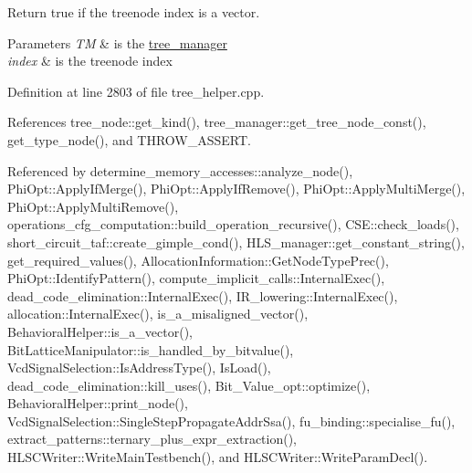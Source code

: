 Return true if the treenode index is a vector. 


\begin{DoxyParams}{Parameters}
{\em TM} & is the \hyperlink{classtree__manager}{tree\+\_\+manager} \\
\hline
{\em index} & is the treenode index \\
\hline
\end{DoxyParams}


Definition at line 2803 of file tree\+\_\+helper.\+cpp.



References tree\+\_\+node\+::get\+\_\+kind(), tree\+\_\+manager\+::get\+\_\+tree\+\_\+node\+\_\+const(), get\+\_\+type\+\_\+node(), and T\+H\+R\+O\+W\+\_\+\+A\+S\+S\+E\+RT.



Referenced by determine\+\_\+memory\+\_\+accesses\+::analyze\+\_\+node(), Phi\+Opt\+::\+Apply\+If\+Merge(), Phi\+Opt\+::\+Apply\+If\+Remove(), Phi\+Opt\+::\+Apply\+Multi\+Merge(), Phi\+Opt\+::\+Apply\+Multi\+Remove(), operations\+\_\+cfg\+\_\+computation\+::build\+\_\+operation\+\_\+recursive(), C\+S\+E\+::check\+\_\+loads(), short\+\_\+circuit\+\_\+taf\+::create\+\_\+gimple\+\_\+cond(), H\+L\+S\+\_\+manager\+::get\+\_\+constant\+\_\+string(), get\+\_\+required\+\_\+values(), Allocation\+Information\+::\+Get\+Node\+Type\+Prec(), Phi\+Opt\+::\+Identify\+Pattern(), compute\+\_\+implicit\+\_\+calls\+::\+Internal\+Exec(), dead\+\_\+code\+\_\+elimination\+::\+Internal\+Exec(), I\+R\+\_\+lowering\+::\+Internal\+Exec(), allocation\+::\+Internal\+Exec(), is\+\_\+a\+\_\+misaligned\+\_\+vector(), Behavioral\+Helper\+::is\+\_\+a\+\_\+vector(), Bit\+Lattice\+Manipulator\+::is\+\_\+handled\+\_\+by\+\_\+bitvalue(), Vcd\+Signal\+Selection\+::\+Is\+Address\+Type(), Is\+Load(), dead\+\_\+code\+\_\+elimination\+::kill\+\_\+uses(), Bit\+\_\+\+Value\+\_\+opt\+::optimize(), Behavioral\+Helper\+::print\+\_\+node(), Vcd\+Signal\+Selection\+::\+Single\+Step\+Propagate\+Addr\+Ssa(), fu\+\_\+binding\+::specialise\+\_\+fu(), extract\+\_\+patterns\+::ternary\+\_\+plus\+\_\+expr\+\_\+extraction(), H\+L\+S\+C\+Writer\+::\+Write\+Main\+Testbench(), and H\+L\+S\+C\+Writer\+::\+Write\+Param\+Decl().

